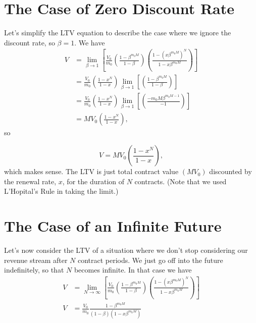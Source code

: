 \documentclass[paper=a4, fontsize=11pt abstract]{scrartcl}
\numberwithin{equation}{section}		%
\numberwithin{figure}{section}			%
\numberwithin{table}{section}				%
\begin{document}
\pagebreak

\section{The Case of Zero Discount Rate}
Let's simplify the LTV equation to describe the case where we ignore the discount rate, so $\beta=1$.
We have
\begin{align} \nonumber
    V &= \lim_{\beta \to 1}\left[\frac{V_0}{m_0}
    \left(\frac{1 - \beta^{m_0 M}}{1 - \beta}\right)
    \left(\frac{1-\left(x \beta^{m_0 M}\right)^N}{1 - x \beta^{m_0 M}}\right)\right] \\ \nonumber
    &= \frac{V_0}{m_0}
    \left(\frac{1 - x^N}{1 - x}\right)
    \lim_{\beta \to 1}
    \left[
    \left(\frac{1 - \beta^{m_0 M}}{1 - \beta}\right)
    \right] \nonumber \\
    &= \frac{V_0}{m_0}
    \left(\frac{1 - x^N}{1 - x}\right)
    \lim_{\beta \to 1}
    \left[
    \left(\frac{- m_0 M\beta^{m_0 M - 1}}{-1}\right)
    \right] \nonumber \\
    &= M V_0
    \left(\frac{1 - x^N}{1 - x}\right) \nonumber,
\end{align}  \label{eq.ltv_closed_from}
so

\begin{equation}
    V = M V_0 \left(\frac{1 - x^N}{1 - x}\right) \nonumber,
\end{equation} \label{eq.ltv_no_discount}
which makes sense.  The LTV is just total contract value $\left(M V_0\right)$ discounted by the renewal rate, $x$, for the duration of $N$ contracts. (Note that we used L'Hopital's Rule in taking the limit.)

\section{The Case of an Infinite Future}
Let's now consider the LTV of a situation where we don't stop considering our revenue stream after $N$ contract periods.  We just go off into the future indefinitely, so that $N$ becomes infinite.  In that case we have
\begin{align} \nonumber
    V &= \lim_{N \to \infty}\left[\frac{V_0}{m_0}
    \left(\frac{1 - \beta^{m_0 M}}{1 - \beta}\right)
    \left(\frac{1-\left(x \beta^{m_0 M}\right)^N}{1 - x \beta^{m_0 M}}\right)\right] \\ 
    V &= \frac{V_0}{m_0}
    \frac{1-\beta^{m_0 M}}{\left(1-\beta\right)\left(1-x\beta^{m_0 M}\right)}
\end{align}
\end{document}
